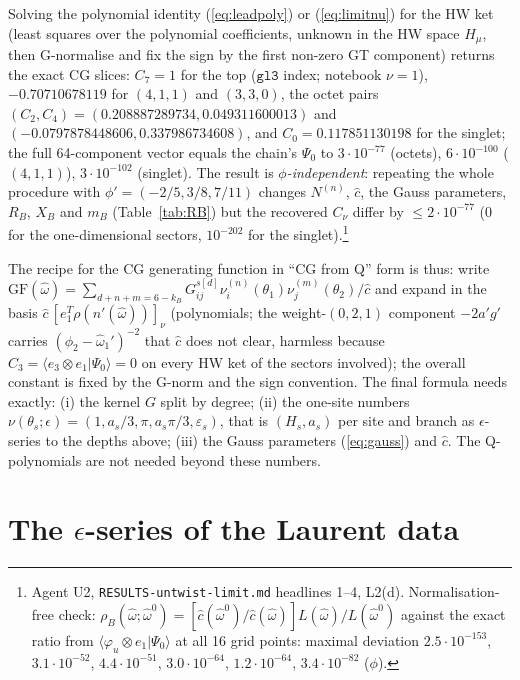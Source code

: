 \documentclass[11pt]{article}
\begin{document}
Solving the polynomial identity (\ref{eq:leadpoly}) or (\ref{eq:limitnu}) for the HW ket (least squares over the polynomial coefficients, unknown in the HW space $H_\mu$, then G-normalise and fix the sign by the first non-zero GT component) returns the exact CG slices: $C_7=1$ for the top ($\mathtt{gl3}$ index; notebook $\nu=1$), $-0.70710678119$ for $(4,1,1)$ and $(3,3,0)$, the octet pairs $(C_2,C_4)=(0.208887289734,0.049311600013)$ and $(-0.0797878448606,0.337986734608)$, and $C_0=0.117851130198$ for the singlet; the full 64-component vector equals the chain's $\Psi_0$ to $3\cdot10^{-77}$ (octets), $6\cdot10^{-100}$ ($(4,1,1)$), $3\cdot10^{-102}$ (singlet).
The result is \emph{$\phi$-independent}: repeating the whole procedure with $\phi'=(-2/5,3/8,7/11)$ changes $N^{(n)}$, $\hat c$, the Gauss parameters, $R_B$, $X_B$ and $m_B$ (Table~\ref{tab:RB}) but the recovered $C_\nu$ differ by $\le2\cdot10^{-77}$ (0 for the one-dimensional sectors, $10^{-202}$ for the singlet).\footnote{Agent U2, \texttt{RESULTS-\allowbreak{}untwist-\allowbreak{}limit.\allowbreak{}md} headlines 1--4, L2(d).
Normalisation-free check: $\rho_B(\hat\omega;\hat\omega^0)=[\hat c(\hat\omega^0)/\hat c(\hat\omega)]L(\hat\omega)/L(\hat\omega^0)$ against the exact ratio from $\langle\varphi_u\otimes e_1|\Psi_0\rangle$ at all 16 grid points: maximal deviation $2.5\cdot10^{-153}$, $3.1\cdot10^{-52}$, $4.4\cdot10^{-51}$, $3.0\cdot10^{-64}$, $1.2\cdot10^{-64}$, $3.4\cdot10^{-82}$ ($\phi$).}

The recipe for the CG generating function in ``CG from Q'' form is thus: write $\mathrm{GF}(\hat\omega)=\sum_{d+n+m=6-k_B}G^{s[d]}_{ij}\nu_i^{(n)}(\theta_1)\nu_j^{(m)}(\theta_2)/\hat c$ and expand in the basis $\hat c\,[e_1^T\rho(n'(\hat\omega))]_\nu$ (polynomials; the weight-$(0,2,1)$ component $-2a'g'$ carries $(\phi_2-\hat\omega_1')^{-2}$ that $\hat c$ does not clear, harmless because $C_3=\langle e_3\otimes e_1|\Psi_0\rangle=0$ on every HW ket of the sectors involved); the overall constant is fixed by the G-norm and the sign convention.
The final formula needs exactly: (i) the kernel $G$ split by degree; (ii) the one-site numbers $\nu(\theta_s;\epsilon)=(1,a_s/3,\pi,a_s\pi/3,\varepsilon_s)$, that is $(H_s,a_s)$ per site and branch as $\epsilon$-series to the depths above; (iii) the Gauss parameters (\ref{eq:gauss}) and $\hat c$. The Q-polynomials are not needed beyond these numbers.

\section{The \texorpdfstring{$\epsilon$}{}-series of the Laurent data}\label{sec:series}
\end{document}
